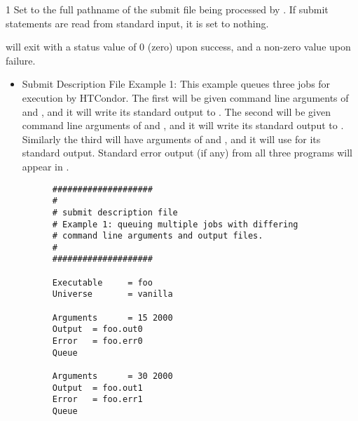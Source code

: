 \begin{ManPage}{\label{man-condor-submit}}{1}
Set to the full pathname of the submit file being processed by . If submit statements
are read from standard input, it is set to nothing.

\ExitStatus

 will exit with a status value of 0 (zero) upon success, and a
non-zero value upon failure.

\label{condor-submit-examples}
\Examples

\begin{itemize} 
\item{Submit Description File Example 1:} This example queues three jobs for
execution by HTCondor. The first will be given command line arguments of
 and , and it will write its standard output
to .
The second will be given command line arguments of 
 and , and it will
write its standard output to .
Similarly the third will have
arguments of 
 and , and it will use  for its standard
output. Standard error output (if any) from all three programs will
appear in .

\footnotesize
\begin{verbatim}
      ####################
      #
      # submit description file
      # Example 1: queuing multiple jobs with differing
      # command line arguments and output files.
      #                                                                      
      ####################                                                   
                                                                         
      Executable     = foo                                                   
      Universe       = vanilla
                                                                         
      Arguments      = 15 2000                                               
      Output  = foo.out0                                                     
      Error   = foo.err0
      Queue                                                                  
                                                                         
      Arguments      = 30 2000                                               
      Output  = foo.out1                                                     
      Error   = foo.err1
      Queue                                                                  
                                                                         

\end{verbatim}
\end{itemize}
\end{ManPage}
